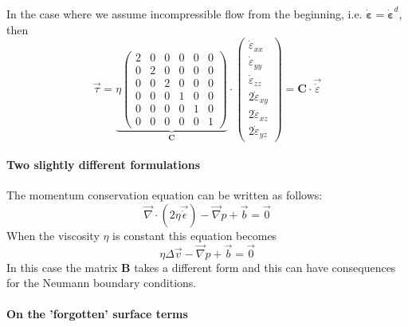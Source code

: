 In the case where we assume incompressible flow from the beginning, i.e. $\dot{\bm \varepsilon}=\dot{\bm \varepsilon}^d$, 
then 
\begin{equation}
\vec \tau  
=
\underbrace{
\eta
\left(
\begin{array}{cccccc}
2 & 0& 0& 0& 0& 0\\
0 & 2& 0& 0& 0& 0\\
0 & 0& 2& 0& 0& 0\\
0 &0 &0 & 1& 0& 0\\
0 &0 &0 & 0& 1& 0\\
0 &0 &0 & 0& 0& 1 
\end{array}
\right)
}_{\bm C}
\cdot
\left(
\begin{array}{c}
\dot\varepsilon_{xx} \\
\dot\varepsilon_{yy} \\
\dot\varepsilon_{zz} \\
2\dot\varepsilon_{xy} \\
2\dot\varepsilon_{xz} \\
2\dot\varepsilon_{yz} 
\end{array}
\right)
=
{\bm C} \cdot \vec{\dot \varepsilon}
\end{equation}

\paragraph{Two slightly different formulations}

The momentum conservation equation can be written as follows:
\[
\vec\nabla\cdot( 2 \eta \vec{\dot\epsilon}) - \vec\nabla p + \vec b = \vec 0
\]
When the viscosity $\eta$ is constant this equation becomes
\[
\eta \Delta \vec v - \vec\nabla p + \vec b = \vec 0
\]
In this case the matrix ${\bm B}$ takes a different form \cite[Eq. 6.24]{dohu03}
and this can have consequences for the Neumann boundary conditions. 
 





\paragraph{On the 'forgotten' surface terms}






